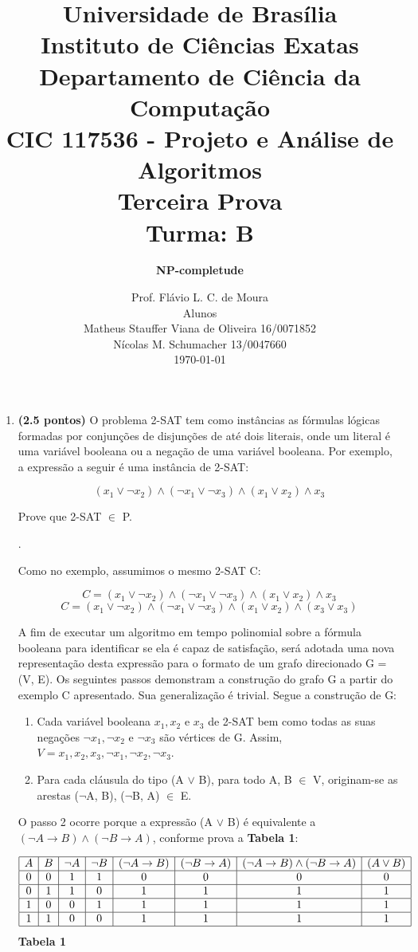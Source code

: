 \documentclass[12pt]{article}
\title{{\large Universidade de Brasília \\ Instituto de Ciências Exatas \\
Departamento de Ciência da Computação} \\[1cm]
CIC 117536 - Projeto e Análise de Algoritmos \\[.5cm]  Terceira Prova \\[.5cm] Turma: B}
\author{{\bf NP-completude}}
\date{Prof. Flávio L. C. de Moura \\[.5cm] Alunos \\[.5cm] Matheus Stauffer Viana de Oliveira 16/0071852 \\[.5cm] Nícolas M. Schumacher 13/0047660\\[.5cm] \today}
\newcommand{\resposta}[1]{ \noindent {\bf Solução}.{\color{blue} #1}}
\begin{document}
\maketitle

\begin{enumerate}
\item {\bf (2.5 pontos)} O problema 2-SAT tem como instâncias as
  fórmulas lógicas formadas por conjunções de disjunções de até dois
  literais, onde um literal é uma variável booleana ou a negação de
  uma variável booleana. Por exemplo, a expressão a seguir é uma
  instância de 2-SAT:

  $$(x_1\lor \neg x_2)\land (\neg x_1 \lor \neg x_3) \land (x_1 \lor x_2) \land x_3$$

  Prove que 2-SAT $\in$ P.

 
  \resposta{
    Como no exemplo, assumimos o mesmo 2-SAT C:

$$C = (x_1\lor \neg x_2)\land (\neg x_1 \lor \neg x_3) \land (x_1 \lor x_2) \land x_3$$
$$C = (x_1\lor \neg x_2)\land (\neg x_1 \lor \neg x_3) \land (x_1 \lor x_2) \land (x_3 \lor x_3)$$

A fim de executar um algoritmo em tempo polinomial sobre a fórmula booleana para identificar se ela é capaz de satisfação, será adotada uma nova representação desta expressão para o formato de um grafo direcionado G = (V, E).
Os seguintes passos demonstram a construção do grafo G a partir do exemplo C apresentado. Sua generalização é trivial. Segue a construção de G:
	\begin{enumerate}[label=\arabic*)]
	    \item Cada variável booleana $x_1, x_2$ e $x_3$ de 2-SAT bem como todas as suas negações $\neg x_1, \neg x_2$ e $\neg x_3$ são vértices de G. Assim, $V = {x_1, x_2, x_3, \neg x_1, \neg x_2, \neg x_3}$.
	    \item Para cada cláusula do tipo (A $\lor$ B), para todo A, B $\in$ V, originam-se as arestas ($\neg$A, B), ($\neg$B, A) $\in$ E.
	\end{enumerate}

O passo 2 ocorre porque a expressão (A $\lor$ B) é equivalente a $(\neg A \rightarrow B) \wedge (\neg B \rightarrow A)$, conforme prova a \textbf{Tabela 1}:

$$\begin{array}{|c|c|c|c|c|c|c|c|}\hline
      A & B & \neg A & \neg B & (\neg A \rightarrow B) & (\neg B \rightarrow A) & (\neg A \rightarrow B) \wedge (\neg B \rightarrow A) & (A \lor B)\\ \hline
      0 & 0 & 1 & 1 & 0 & 0 & 0 & 0 \\ \hline
      0 & 1 & 1 & 0 & 1 & 1 & 1 & 1 \\ \hline
      1 & 0 & 0 & 1 & 1 & 1 & 1 & 1 \\ \hline
      1 & 1 & 0 & 0 & 1 & 1 & 1 & 1 \\ \hline
  \end{array}$$
\textbf{Tabela 1}

}
\end{enumerate}
\end{document}
